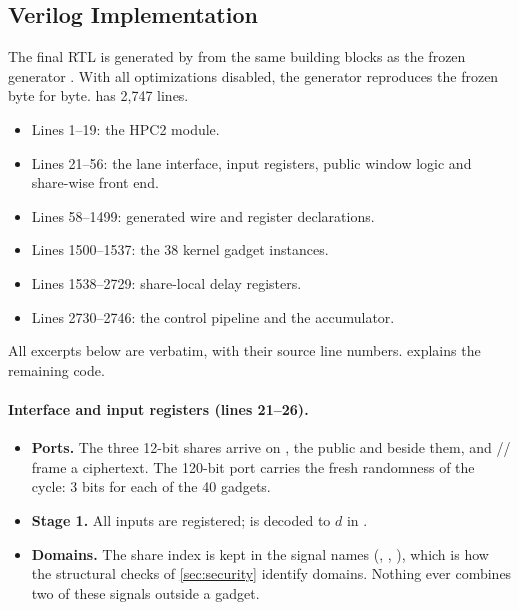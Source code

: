 \subsection{Verilog Implementation}\label{sec:rtl}
The final RTL is generated by  from the same building blocks as the frozen generator . With all optimizations disabled, the generator reproduces the frozen  byte for byte.  has 2,747 lines.
\begin{itemize}
  \item Lines 1--19: the HPC2 module.
  \item Lines 21--56: the lane interface, input registers, public window logic and share-wise front end.
  \item Lines 58--1499: generated wire and register declarations.
  \item Lines 1500--1537: the 38 kernel gadget instances.
  \item Lines 1538--2729: share-local delay registers.
  \item Lines 2730--2746: the control pipeline and the accumulator.
\end{itemize}
All excerpts below are verbatim, with their source line numbers.  explains the remaining code.

\paragraph{Interface and input registers (lines 21--26).}\leavevmode\par

\begin{itemize}
  \item \textbf{Ports.} The three 12-bit shares arrive on , the public  and  beside them, and // frame a ciphertext. The 120-bit port  carries the fresh randomness of the cycle: 3 bits for each of the 40 gadgets.
  \item \textbf{Stage 1.} All inputs are registered;  is decoded to $d$ in .
  \item \textbf{Domains.} The share index is kept in the signal names (, , ), which is how the structural checks of \cref{sec:security} identify domains. Nothing ever combines two of these signals outside a gadget.
\end{itemize}

